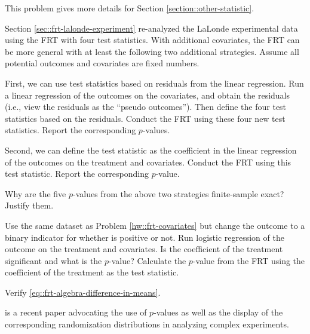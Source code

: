 \begin{HomeworkProblem}\label{exr:3-6}


This problem gives more details for Section \ref{section::other-statistic}.


Section \ref{sec::frt-lalonde-experiment} re-analyzed the LaLonde experimental data using the FRT with four test statistics. With additional covariates, the FRT can be more general with at least the following two additional strategies. Assume all potential outcomes and covariates are fixed numbers.

First, we can use test statistics based on residuals from the linear regression. Run a linear regression of the outcomes on the covariates, and obtain the residuals (i.e., view the residuals as the ``pseudo outcomes''). Then define the four test statistics based on the residuals. Conduct the FRT using these four new test statistics. Report the corresponding $p$-values.


Second, we can define the test statistic as the coefficient in the linear regression of the outcomes on the treatment and covariates. Conduct the FRT using this test statistic. Report the corresponding $p$-value.


Why are the five $p$-values from the above two strategies finite-sample exact? Justify them.



\end{HomeworkProblem}

\begin{HomeworkProblem}\label{exr:3-7}


Use the same dataset as Problem \ref{hw::frt-covariates} but change the outcome to a binary indicator for whether  is positive or not. Run logistic regression of the outcome on the treatment and covariates. Is the coefficient of the treatment significant and what is the $p$-value? Calculate the $p$-value from the FRT using the coefficient of the treatment as the test statistic.




\end{HomeworkProblem}

\begin{HomeworkProblem}\label{exr:3-8}

Verify \eqref{eq::frt-algebra-difference-in-means}.



\end{HomeworkProblem}

\begin{HomeworkProblem}\label{exr:3-9}

\citet{bind2020possible} is a recent paper advocating the use of $p$-values as well as the display of the corresponding randomization distributions in analyzing complex experiments.


\end{HomeworkProblem}
